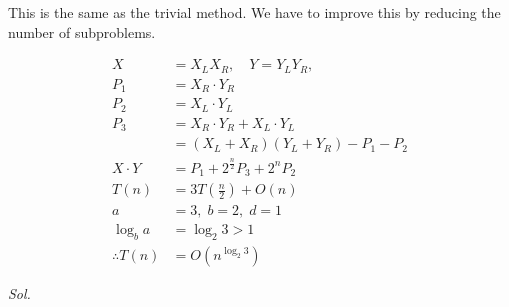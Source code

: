 \begin{center}
\end{center}

This is the same as the trivial method. We have to improve this by reducing the number of subproblems.

\begin{align*}
	X               & = X_L  X_R, \quad Y = Y_L  Y_R, \quad \\
	P_1             & = X_R \cdot Y_R                       \\
	P_2             & = X_L \cdot Y_L                       \\
	P_3             & = X_R \cdot Y_R + X_L \cdot Y_L       \\
	                & = (X_L + X_R)(Y_L + Y_R) - P_1 - P_2  \\
	X \cdot Y       & = P_1 + 2^{\frac{n}{2}}P_3 + 2^n P_2  \\
	T(n)            & = 3T\left(\frac{n}{2}\right) + O(n)   \\
	a               & = 3, \; b = 2, \; d = 1               \\
	\log_b a        & = \log_2 3 > 1                        \\
	\therefore T(n) & = O(n^{\log_2 3})
\end{align*}


\pagebreak


\textit{ Sol. }

